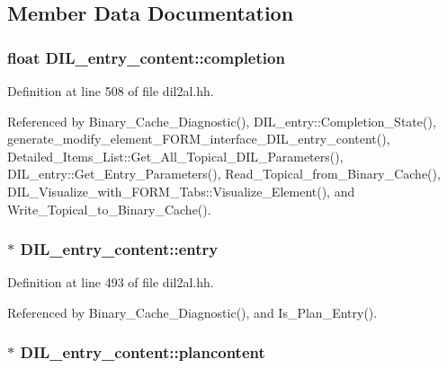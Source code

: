 \subsection{Member Data Documentation}
\subsubsection{\setlength{\rightskip}{0pt plus 5cm}float DIL\_\-entry\_\-content::completion}\label{classDIL__entry__content_m2}




Definition at line 508 of file dil2al.hh.

Referenced by Binary\_\-Cache\_\-Diagnostic(), DIL\_\-entry::Completion\_\-State(), generate\_\-modify\_\-element\_\-FORM\_\-interface\_\-DIL\_\-entry\_\-content(), Detailed\_\-Items\_\-List::Get\_\-All\_\-Topical\_\-DIL\_\-Parameters(), DIL\_\-entry::Get\_\-Entry\_\-Parameters(), Read\_\-Topical\_\-from\_\-Binary\_\-Cache(), DIL\_\-Visualize\_\-with\_\-FORM\_\-Tabs::Visualize\_\-Element(), and Write\_\-Topical\_\-to\_\-Binary\_\-Cache().
\subsubsection{$\ast$ DIL\_\-entry\_\-content::entry\hspace{0.3cm}{\tt  [protected]}}\label{classDIL__entry__content_n0}




Definition at line 493 of file dil2al.hh.

Referenced by Binary\_\-Cache\_\-Diagnostic(), and Is\_\-Plan\_\-Entry().
\subsubsection{$\ast$ DIL\_\-entry\_\-content::plancontent\hspace{0.3cm}{\tt  [protected]}}\label{classDIL__entry__content_n2}




